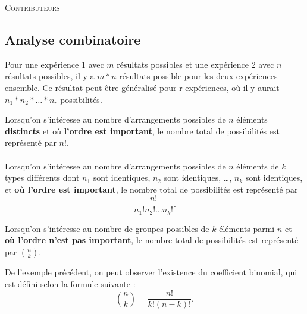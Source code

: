 \documentclass[10pt, french]{article}
\begin{document}
\begin{center}
	\textsc{\Large Contributeurs}\\[0.5cm] 
\end{center}


\newpage

\begin{multicols*}{2}

\section{Analyse combinatoire}

\begin{definitionNOHFILL}
Pour une expérience 1 avec $m$ résultats possibles et une expérience 2 avec $n$ résultats possibles, il y a $m * n$ résultats possible pour les deux expériences ensemble. Ce résultat peut être généralisé pour r expériences, où il y aurait $n_1*n_2*\dots{}*n_r$ possibilités.
\end{definitionNOHFILL}

\begin{definitionNOHFILL}[Permutations]
Lorsqu'on s'intéresse au nombre d'arrangements possibles de $n$ éléments \textbf{distincts} et où \textbf{l'ordre est important}, le nombre total de possibilités est représenté par $n!$.\\
\\
Lorsqu'on s'intéresse au nombre d'arrangements possibles de $n$ éléments de $k$ types différents dont $n_1$ sont identiques, $n_2$ sont identiques, \dots, $n_k$ sont identiques, et \textbf{où l'ordre est important}, le nombre total de possibilités est représenté par $$\frac{n!}{n_1!n_2! \dots n_k!}.$$
\end{definitionNOHFILL}

\begin{definitionNOHFILL}[Combinaisons]
Lorsqu'on s'intéresse au nombre de groupes possibles de $k$ éléments parmi $n$ et \textbf{où l'ordre n'est pas important}, le nombre total de possibilités est représenté par $\binom{n}{k}$.
\end{definitionNOHFILL}

\begin{distributions}[Notation]
De l'exemple précédent, on peut observer l'existence du coefficient binomial, qui est défini selon la formule suivante : $$\binom{n}{k} = \frac{n!}{k!(n-k)!}.$$
\end{distributions}


\end{multicols*}
\end{document}
